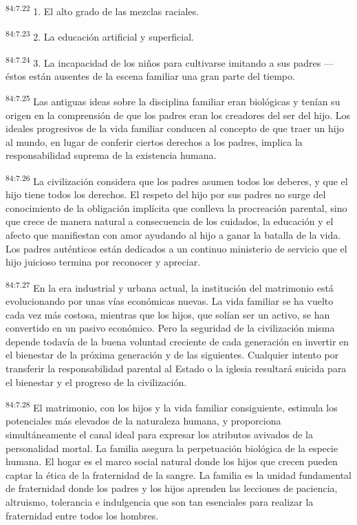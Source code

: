 \par
\textsuperscript{84:7.22} 1. El alto grado de las mezclas raciales.

\par
\textsuperscript{84:7.23} 2. La educación artificial y superficial.

\par
\textsuperscript{84:7.24} 3. La incapacidad de los niños para cultivarse imitando a sus padres ---éstos están ausentes de la escena familiar una gran parte del tiempo.

\par
\textsuperscript{84:7.25} Las antiguas ideas sobre la disciplina familiar eran biológicas y tenían su origen en la comprensión de que los padres eran los creadores del ser del hijo. Los ideales progresivos de la vida familiar conducen al concepto de que traer un hijo al mundo, en lugar de conferir ciertos derechos a los padres, implica la responsabilidad suprema de la existencia humana.

\par
\textsuperscript{84:7.26} La civilización considera que los padres asumen todos los deberes, y que el hijo tiene todos los derechos. El respeto del hijo por sus padres no surge del conocimiento de la obligación implícita que conlleva la procreación parental, sino que crece de manera natural a consecuencia de los cuidados, la educación y el afecto que manifiestan con amor ayudando al hijo a ganar la batalla de la vida. Los padres auténticos están dedicados a un continuo ministerio de servicio que el hijo juicioso termina por reconocer y apreciar.

\par
\textsuperscript{84:7.27} En la era industrial y urbana actual, la institución del matrimonio está evolucionando por unas vías económicas nuevas. La vida familiar se ha vuelto cada vez más costosa, mientras que los hijos, que solían ser un activo, se han convertido en un pasivo económico. Pero la seguridad de la civilización misma depende todavía de la buena voluntad creciente de cada generación en invertir en el bienestar de la próxima generación y de las siguientes. Cualquier intento por transferir la responsabilidad parental al Estado o la iglesia resultará suicida para el bienestar y el progreso de la civilización.

\par
\textsuperscript{84:7.28} El matrimonio, con los hijos y la vida familiar consiguiente, estimula los potenciales más elevados de la naturaleza humana, y proporciona simultáneamente el canal ideal para expresar los atributos avivados de la personalidad mortal. La familia asegura la perpetuación biológica de la especie humana. El hogar es el marco social natural donde los hijos que crecen pueden captar la ética de la fraternidad de la sangre. La familia es la unidad fundamental de fraternidad donde los padres y los hijos aprenden las lecciones de paciencia, altruismo, tolerancia e indulgencia que son tan esenciales para realizar la fraternidad entre todos los hombres.

